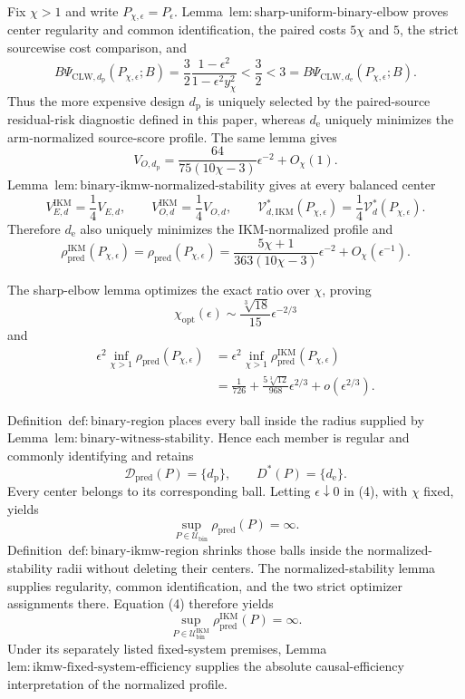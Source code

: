 Fix \(\chi>1\) and write \(P_{\chi,\epsilon}=P_\epsilon\).  Lemma~\(\mathrm{lem{:}sharp\text{-}uniform\text{-}binary\text{-}elbow}\) proves center regularity and common identification, the paired costs \(5\chi\) and \(5\), the strict sourcewise cost comparison, and
\[
 B\Psi_{\mathrm{CLW},d_{\mathrm p}}(P_{\chi,\epsilon};B)
 =\frac32\frac{1-\epsilon^2}{1-\epsilon^2y_\chi^2}
 <\frac32<3
 =B\Psi_{\mathrm{CLW},d_{\mathrm e}}(P_{\chi,\epsilon};B).     \tag{1}
\]
Thus the more expensive design \(d_{\mathrm p}\) is uniquely selected by the paired-source residual-risk diagnostic defined in this paper, whereas \(d_{\mathrm e}\) uniquely minimizes the arm-normalized source-score profile.  The same lemma gives
\[
 V_{O,d_{\mathrm p}}
 =\frac{64}{75(10\chi-3)}\epsilon^{-2}+O_\chi(1).              \tag{2}
\]
Lemma~\(\mathrm{lem{:}binary\text{-}ikmw\text{-}normalized\text{-}stability}\) gives at every balanced center
\[
 V_{E,d}^{\mathrm{IKM}}=\frac14V_{E,d},
 \qquad V_{O,d}^{\mathrm{IKM}}=\frac14V_{O,d},
 \qquad \mathcal V_{d,\mathrm{IKM}}^*(P_{\chi,\epsilon})
 =\frac14\mathcal V_d^*(P_{\chi,\epsilon}).                  \tag{3}
\]
Therefore \(d_{\mathrm e}\) also uniquely minimizes the IKM-normalized profile and
\[
 \rho_{\mathrm{pred}}^{\mathrm{IKM}}(P_{\chi,\epsilon})
 =\rho_{\mathrm{pred}}(P_{\chi,\epsilon})
 =\frac{5\chi+1}{363(10\chi-3)}\epsilon^{-2}
 +O_\chi(\epsilon^{-1}).                                     \tag{4}
\]

The sharp-elbow lemma optimizes the exact ratio over \(\chi\), proving
\[
 \chi_{\mathrm{opt}}(\epsilon)
 \sim\frac{\sqrt[3]{18}}{15}\epsilon^{-2/3}
\]
and
\[
\begin{aligned}
 \epsilon^2\inf_{\chi>1}\rho_{\mathrm{pred}}(P_{\chi,\epsilon})
 &=\epsilon^2\inf_{\chi>1}\rho_{\mathrm{pred}}^{\mathrm{IKM}}(P_{\chi,\epsilon})\\
 &=\frac1{726}+\frac{5\sqrt[3]{12}}{968}\epsilon^{2/3}
 +o(\epsilon^{2/3}).                                         \tag{5}
\end{aligned}
\]

Definition~\(\mathrm{def{:}binary\text{-}region}\) places every ball inside the radius supplied by Lemma~\(\mathrm{lem{:}binary\text{-}witness\text{-}stability}\).  Hence each member is regular and commonly identifying and retains
\[
 \mathcal D_{\mathrm{pred}}(P)=\{d_{\mathrm p}\},
 \qquad D^*(P)=\{d_{\mathrm e}\}.
\]
Every center belongs to its corresponding ball.  Letting \(\epsilon\downarrow0\) in (4), with \(\chi\) fixed, yields
\[
 \sup_{P\in\mathcal U_{\mathrm{bin}}}\rho_{\mathrm{pred}}(P)=\infty. \tag{6}
\]
Definition~\(\mathrm{def{:}binary\text{-}ikmw\text{-}region}\) shrinks those balls inside the normalized-stability radii without deleting their centers.  The normalized-stability lemma supplies regularity, common identification, and the two strict optimizer assignments there.  Equation (4) therefore yields
\[
 \sup_{P\in\mathcal U_{\mathrm{bin}}^{\mathrm{IKM}}}
 \rho_{\mathrm{pred}}^{\mathrm{IKM}}(P)=\infty.               \tag{7}
\]
Under its separately listed fixed-system premises, Lemma~\(\mathrm{lem{:}ikmw\text{-}fixed\text{-}system\text{-}efficiency}\) supplies the absolute causal-efficiency interpretation of the normalized profile.

